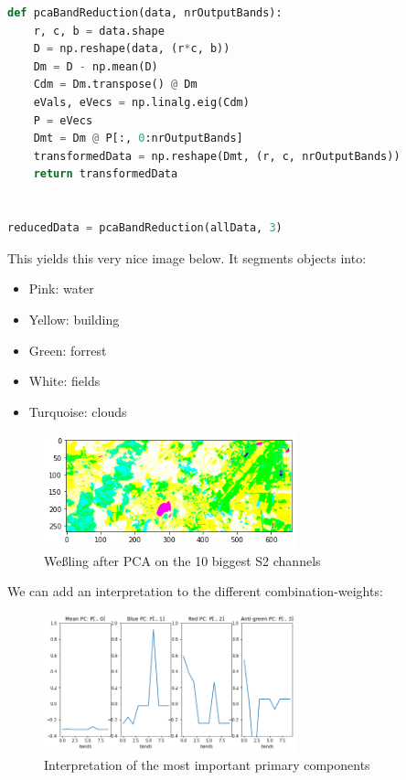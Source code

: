 \begin{lstlisting}[language=python]
def pcaBandReduction(data, nrOutputBands):
    r, c, b = data.shape
    D = np.reshape(data, (r*c, b))
    Dm = D - np.mean(D)
    Cdm = Dm.transpose() @ Dm
    eVals, eVecs = np.linalg.eig(Cdm)
    P = eVecs
    Dmt = Dm @ P[:, 0:nrOutputBands]
    transformedData = np.reshape(Dmt, (r, c, nrOutputBands))
    return transformedData


reducedData = pcaBandReduction(allData, 3)
\end{lstlisting}

This yields this very nice image below. It segments  objects into: 
\begin{itemize}
    \item Pink: water
    \item Yellow: building
    \item Green: forrest
    \item White: fields
    \item Turquoise: clouds
\end{itemize}

\begin{figure}[H]
    \caption{Weßling after PCA on the 10 biggest S2 channels}
    \centering
      \includegraphics[width=0.65\textwidth]{images/pca_wessling.png}
\end{figure}

We can add an interpretation to the different combination-weights:
\begin{figure}[H]
    \caption{Interpretation of the most important primary components}
    \centering
      \includegraphics[width=0.65\textwidth]{images/pca_wessling_pcs.png}
\end{figure}




